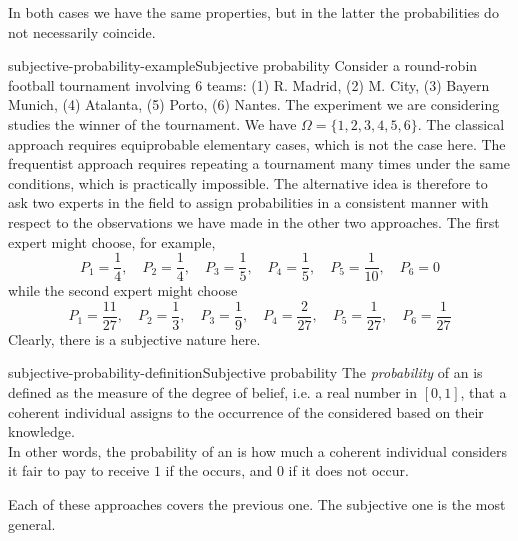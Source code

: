 \documentclass[preview]{standalone}
\begin{document}
\begin{plainhtml}
    In both cases we have the same properties,
    but in the latter the probabilities do not necessarily coincide.
\end{plainhtml}

\begin{snippetexample}{subjective-probability-example}{Subjective probability}
    Consider a round-robin football tournament involving 6 teams:
    (1) R. Madrid, (2) M. City, (3) Bayern Munich, (4) Atalanta, (5) Porto, (6) Nantes.
    The experiment we are considering studies the winner of the tournament.
    We have \(\Omega = \{1,2,3,4,5,6\}\).
    The classical approach requires equiprobable elementary cases, which is not the case here.
    The frequentist approach requires repeating a tournament many times under the same conditions,
    which is practically impossible.
    The alternative idea is therefore to ask two experts in the field
    to assign probabilities in a consistent manner with respect to the observations we have
    made in the other two approaches.
    The first expert might choose, for example, 
    \[
        P_1 = \frac{1}{4}, \quad
        P_2 = \frac{1}{4}, \quad
        P_3 = \frac{1}{5}, \quad
        P_4 = \frac{1}{5}, \quad
        P_5 = \frac{1}{10}, \quad
        P_6 = 0
    \]
    while the second expert might choose
    \[
        P_1 = \frac{11}{27}, \quad
        P_2 = \frac{1}{3}, \quad
        P_3 = \frac{1}{9}, \quad
        P_4 = \frac{2}{27}, \quad
        P_5 = \frac{1}{27}, \quad
        P_6 = \frac{1}{27}
    \]
    Clearly, there is a subjective nature here.
\end{snippetexample}

\begin{snippetdefinition}{subjective-probability-definition}{Subjective probability}
    The \emph{probability} of an \event is defined as
    the measure of the degree of belief, i.e. a real number in \([0,1]\),
    that a coherent individual assigns to the occurrence of the considered \event
    based on their knowledge. \\
    In other words, the probability of an \event is how much a coherent individual considers it fair to pay
    to receive \(1\) if the \event occurs, and \(0\) if it does not occur.
\end{snippetdefinition}

\begin{plainhtml}
    Each of these approaches covers the previous one.
    The subjective one is the most general.
\end{plainhtml}
\end{document}
